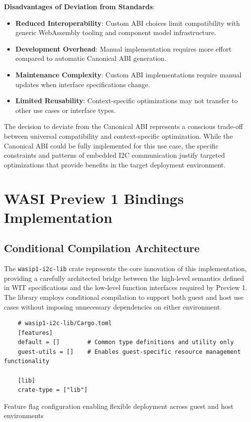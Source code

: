 \textbf{Disadvantages of Deviation from Standards}:
\begin{itemize}
    \item \textbf{Reduced Interoperability}: Custom ABI choices limit compatibility with generic WebAssembly tooling and component model infrastructure.
    \item \textbf{Development Overhead}: Manual implementation requires more effort compared to automatic Canonical ABI generation.
    \item \textbf{Maintenance Complexity}: Custom ABI implementations require manual updates when interface specifications change.
    \item \textbf{Limited Reusability}: Context-specific optimizations may not transfer to other use cases or interface types.
\end{itemize}

The decision to deviate from the Canonical ABI represents a conscious trade-off between universal compatibility and context-specific optimization. While the Canonical ABI could be fully implemented for this use case, the specific constraints and patterns of embedded I2C communication justify targeted optimizations that provide benefits in the target deployment environment.

\section{WASI Preview 1 Bindings Implementation}
\label{sec:wasip1-bindings}

\subsection{Conditional Compilation Architecture}

The \texttt{wasip1-i2c-lib} crate represents the core innovation of this implementation, providing a carefully architected bridge between the high-level semantics defined in WIT specifications and the low-level function interfaces required by Preview 1. The library employs conditional compilation to support both guest and host use cases without imposing unnecessary dependencies on either environment.

\begin{listing}[H]
    \begin{verbatim}
    # wasip1-i2c-lib/Cargo.toml
    [features]
    default = []        # Common type definitions and utility only
    guest-utils = []    # Enables guest-specific resource management functionality
    
    [lib]
    crate-type = ["lib"]
    \end{verbatim}
    \caption{Feature flag configuration enabling flexible deployment across guest and host environments}
    \label{lst:conditional-compilation}
\end{listing}

